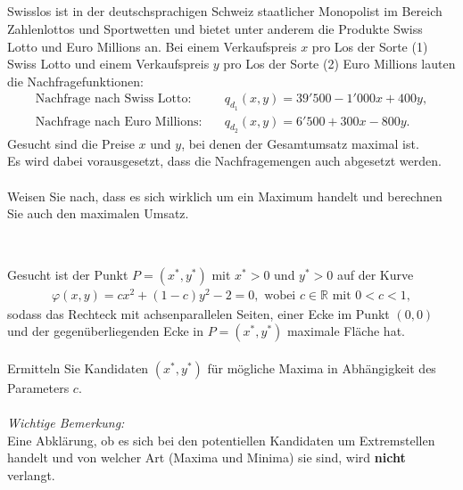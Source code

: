\subsection*{}
Swisslos ist in der deutschsprachigen Schweiz staatlicher Monopolist im Bereich Zahlenlottos und Sportwetten und bietet unter anderem die Produkte Swiss Lotto und Euro Millions an.
Bei einem  Verkaufspreis $ x $ pro Los der Sorte (1) Swiss Lotto und einem Verkaufspreis $ y $ pro Los der Sorte (2) Euro Millions lauten die Nachfragefunktionen:
\begin{align*}
\textrm{Nachfrage nach Swiss Lotto:} 
&\quad
q_{d_1}(x,y) = 39'500 - 1'000 x + 400y,\\
\textrm{Nachfrage nach Euro Millions:}
&\quad
q_{d_2}(x,y) = 6'500 + 300 x - 800 y.
\end{align*}
Gesucht sind die Preise $ x $ und $ y $, bei denen der Gesamtumsatz maximal ist.\\
Es wird dabei vorausgesetzt, dass die Nachfragemengen auch abgesetzt werden.\\
\\
Weisen Sie nach, dass es sich wirklich um ein Maximum handelt und berechnen Sie auch den maximalen Umsatz.
\\
\\
\subsection*{}
Gesucht ist der Punkt $ P = (x^\ast,y^\ast) $ mit $ x^\ast > 0  $ und $ y^\ast > 0 $ auf der Kurve
\begin{align*}
\varphi(x,y) = 
cx^2 +(1-c) y^2 -2 = 0, \textrm{ wobei } c \in \mathbb{R} \textrm{ mit } 0 < c < 1,
\end{align*}
sodass das Rechteck mit achsenparallelen Seiten, einer Ecke im Punkt $ (0,0) $ und der gegenüberliegenden Ecke in $ P = (x^\ast, y^\ast) $ maximale Fläche hat.\\
\\
Ermitteln Sie Kandidaten $ (x^\ast, y^\ast) $ für mögliche Maxima in Abhängigkeit des Parameters $ c $.\\
\\
\textit{Wichtige Bemerkung:}\\
Eine Abklärung, ob es sich bei den potentiellen Kandidaten um Extremstellen handelt und von welcher Art (Maxima und Minima) sie sind, wird \textbf{nicht} verlangt.
 \\
\\
